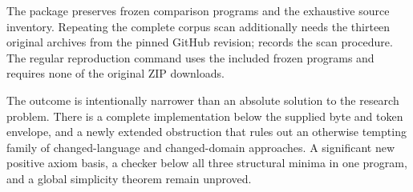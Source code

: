 The package preserves frozen comparison programs and the exhaustive
source inventory. Repeating the complete corpus scan additionally needs
the thirteen original archives from the pinned GitHub revision;
 records the scan procedure. The regular
reproduction command uses the included frozen programs and requires
none of the original ZIP downloads.

The outcome is intentionally narrower than an absolute solution to the
research problem. There is a complete implementation below the supplied
byte and token envelope, and a newly extended obstruction that rules
out an otherwise tempting family of changed-language and changed-domain
approaches. A significant new positive axiom basis, a checker below all
three structural minima in one program, and a global simplicity theorem
remain unproved.
